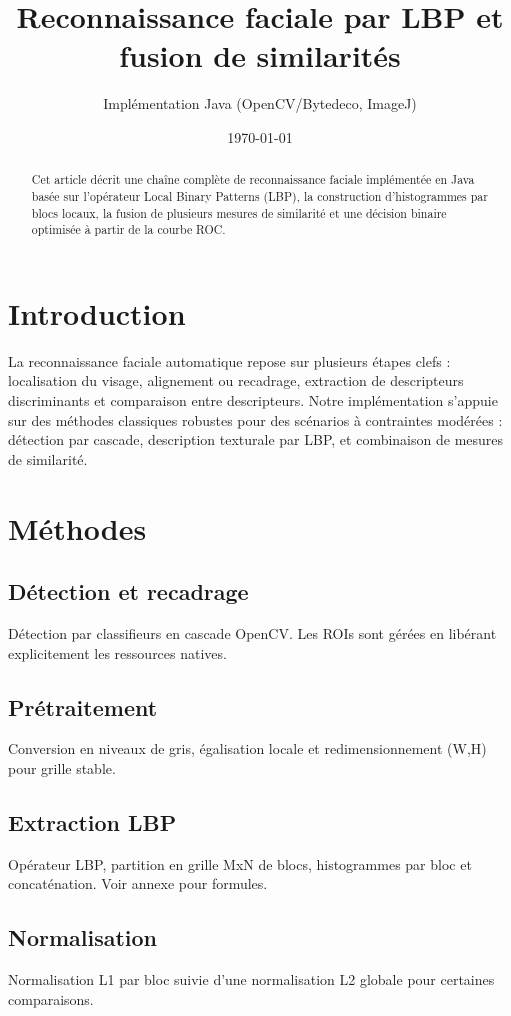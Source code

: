 \documentclass[11pt,a4paper]{article}
\title{Reconnaissance faciale par LBP et fusion de similarités}
\author{Implémentation Java (OpenCV/Bytedeco, ImageJ)}
\date{\today}
\begin{document}
\maketitle
\begin{abstract}
Cet article décrit une chaîne complète de reconnaissance faciale implémentée en Java basée sur l'opérateur Local Binary Patterns (LBP), la construction d'histogrammes par blocs locaux, la fusion de plusieurs mesures de similarité et une décision binaire optimisée à partir de la courbe ROC.
\end{abstract}

\section{Introduction}
La reconnaissance faciale automatique repose sur plusieurs étapes clefs : localisation du visage, alignement ou recadrage, extraction de descripteurs discriminants et comparaison entre descripteurs. Notre implémentation s'appuie sur des méthodes classiques robustes pour des scénarios à contraintes modérées : détection par cascade, description texturale par LBP, et combinaison de mesures de similarité.

\section{Méthodes}
\subsection{Détection et recadrage}
Détection par classifieurs en cascade OpenCV. Les ROIs sont gérées en libérant explicitement les ressources natives.

\subsection{Prétraitement}
Conversion en niveaux de gris, égalisation locale et redimensionnement (W,H) pour grille stable.

\subsection{Extraction LBP}
Opérateur LBP, partition en grille MxN de blocs, histogrammes par bloc et concaténation. Voir annexe pour formules.

\subsection{Normalisation}
Normalisation L1 par bloc suivie d'une normalisation L2 globale pour certaines comparaisons.
\end{document}
